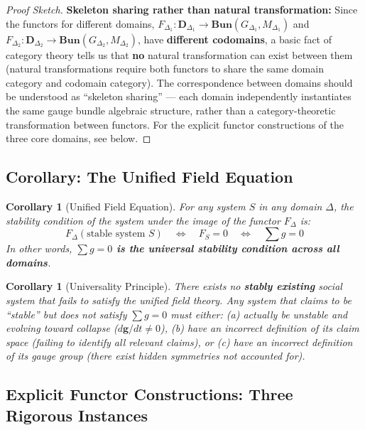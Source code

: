 \documentclass[12pt,a4paper]{article}
\theoremstyle{plain}
\newtheorem{corollary}[theorem]{Corollary}
\theoremstyle{definition}
\newcommand{\gv}{\mathbf{g}}
\newcommand{\curv}{F}
\newcommand{\BundleCat}{\mathbf{Bun}}
\begin{document}
\begin{proof}[Proof Sketch]
\textbf{Skeleton sharing rather than natural transformation:}
Since the functors for different domains, $F_{\Delta_1}: \mathbf{D}_{\Delta_1} \to \BundleCat(G_{\Delta_1}, M_{\Delta_1})$ and
$F_{\Delta_2}: \mathbf{D}_{\Delta_2} \to \BundleCat(G_{\Delta_2}, M_{\Delta_2})$, have \textbf{different codomains},
a basic fact of category theory tells us that \textbf{no} natural transformation can exist between them (natural transformations require both functors to share the same domain category and codomain category).
The correspondence between domains should be understood as ``skeleton sharing'' — each domain independently instantiates the same gauge bundle algebraic structure,
rather than a category-theoretic transformation between functors. For the explicit functor constructions of the three core domains, see below.
\end{proof}

\subsection{Corollary: The Unified Field Equation}

\begin{corollary}[Unified Field Equation]
For any system $S$ in any domain $\Delta$, the stability condition of the system under the image of the functor $F_\Delta$ is:
\begin{equation}
    F_\Delta(\text{stable system } S) \quad \Longleftrightarrow \quad \curv_S = 0 \quad \Longleftrightarrow \quad \sum g = 0
\end{equation}
In other words, \textbf{$\sum g = 0$ is the universal stability condition across all domains}.
\end{corollary}

\begin{corollary}[Universality Principle]
There exists no \textbf{stably existing} social system that fails to satisfy the unified field theory.
Any system that claims to be ``stable'' but does not satisfy $\sum g = 0$ must either:
(a) actually be unstable and evolving toward collapse ($d\gv/dt \neq 0$),
(b) have an incorrect definition of its claim space (failing to identify all relevant claims), or
(c) have an incorrect definition of its gauge group (there exist hidden symmetries not accounted for).
\end{corollary}

\newpage

\subsection{Explicit Functor Constructions: Three Rigorous Instances}
\end{document}

